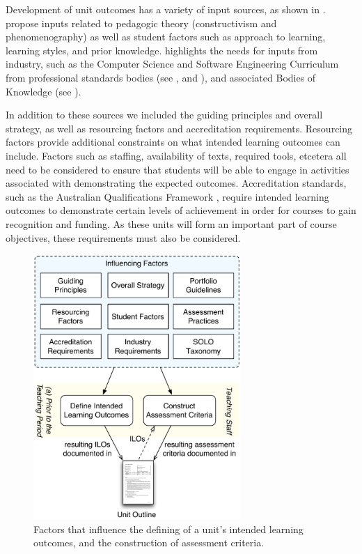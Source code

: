 Development of unit outcomes has a variety of input sources, as shown in . \citet{Thota:2010} propose inputs related to pedagogic theory (constructivism and phenomenography) as well as student factors such as approach to learning, learning styles, and prior knowledge. \citet{Armarego:2009} highlights the needs for inputs from industry, such as the Computer Science and Software Engineering Curriculum from professional standards bodies (see \citet{Lethbridge:2006}, \citet{Cassel:2008} and \citet{CSC2013}), and associated Bodies of Knowledge (see \citet{Abran:2001}). 

In addition to these sources we included the guiding principles and overall strategy, as well as resourcing factors and accreditation requirements. Resourcing factors provide additional constraints on what intended learning outcomes can include. Factors such as staffing, availability of texts, required tools, etcetera all need to be considered to ensure that students will be able to engage in activities associated with demonstrating the expected outcomes. Accreditation standards, such as the Australian Qualifications Framework \cite{AQF:2013}, require intended learning outcomes to demonstrate certain levels of achievement in order for courses to gain recognition and funding. As these units will form an important part of course objectives, these requirements must also be considered. 

\begin{figure}[htbp]
	\centering
	\includegraphics[width=0.7\textwidth]{DefiningILOs}
	\caption{Factors that influence the defining of a unit's intended learning outcomes, and the construction of assessment criteria.}
	\label{fig:defining_ilos}
\end{figure}

